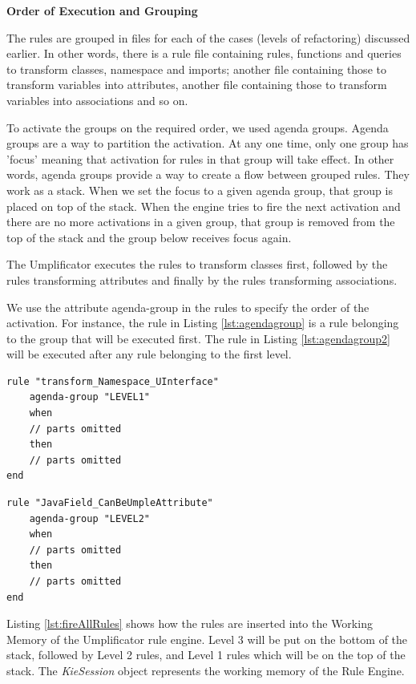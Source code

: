 \textbf{Order of Execution and Grouping}

The rules are grouped in files for each of the cases (levels of refactoring) discussed earlier. In other words, there is a rule file containing rules, functions and queries to transform classes, namespace and imports; another file containing those to transform variables into attributes, another file containing those to transform variables into associations and so on.

To activate the groups on the required order, we used agenda groups. Agenda groups are a way to partition the activation. At any one time, only one group has 'focus' meaning that activation for rules in that group will take effect. 
In other words, agenda groups provide a way to create a flow between grouped rules. They work as a stack. When we set the focus to a given agenda group, that group is placed on top of the stack. When the engine tries to fire the next activation and there are no more activations in a given group, that group is removed from the top of the stack and the group below receives focus again.

The Umplificator executes the rules to transform classes first, followed by the rules transforming attributes and finally by the rules transforming associations. 

We use the attribute agenda-group in the rules to specify the order of the activation. For instance, the rule in Listing \ref{lst:agendagroup} is a rule belonging to the group that will be executed first. The rule in Listing \ref{lst:agendagroup2} will be executed after any rule belonging to the first level. 

\begin{lstlisting}[language={drools},label={lst:agendagroup}, caption=A rule belonging to Level 1] 
rule "transform_Namespace_UInterface"
	agenda-group "LEVEL1" 
	when
	// parts omitted
	then
	// parts omitted
end
\end{lstlisting}

\begin{lstlisting}[language={drools},label={lst:agendagroup2}, caption=A rule belonging to Level 2] 
rule "JavaField_CanBeUmpleAttribute"
	agenda-group "LEVEL2" 
	when
	// parts omitted
	then
	// parts omitted
end
\end{lstlisting}

Listing \ref{lst:fireAllRules} shows how the rules are inserted into the Working Memory of the Umplificator rule engine. Level 3 will be put on the bottom of the stack, followed by Level 2 rules, and Level 1 rules which will be on the top of the stack. The \textit{KieSession} object represents the working memory of the Rule Engine.


